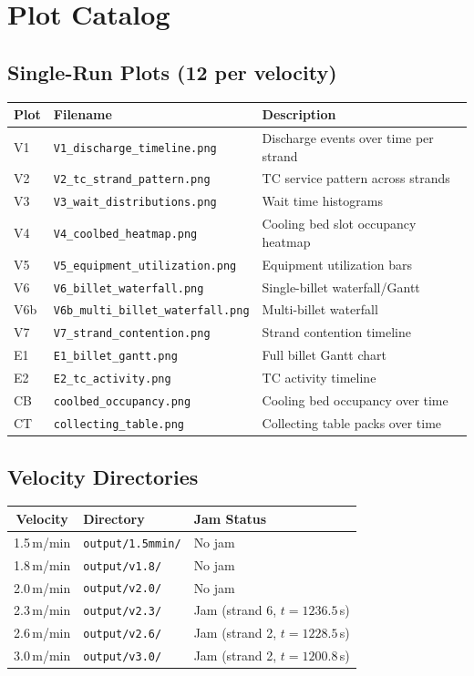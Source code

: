 \documentclass[11pt,a4paper]{article}
\begin{document}
\section{Plot Catalog}
\label{app:plots}

\subsection{Single-Run Plots (12 per velocity)}

\begin{longtable}{@{}llp{7cm}@{}}
\toprule
Plot & Filename & Description \\
\midrule
\endhead
V1 & \texttt{V1\_discharge\_timeline.png} & Discharge events over time per strand \\
V2 & \texttt{V2\_tc\_strand\_pattern.png} & TC service pattern across strands \\
V3 & \texttt{V3\_wait\_distributions.png} & Wait time histograms \\
V4 & \texttt{V4\_coolbed\_heatmap.png} & Cooling bed slot occupancy heatmap \\
V5 & \texttt{V5\_equipment\_utilization.png} & Equipment utilization bars \\
V6 & \texttt{V6\_billet\_waterfall.png} & Single-billet waterfall/Gantt \\
V6b & \texttt{V6b\_multi\_billet\_waterfall.png} & Multi-billet waterfall \\
V7 & \texttt{V7\_strand\_contention.png} & Strand contention timeline \\
E1 & \texttt{E1\_billet\_gantt.png} & Full billet Gantt chart \\
E2 & \texttt{E2\_tc\_activity.png} & TC activity timeline \\
CB & \texttt{coolbed\_occupancy.png} & Cooling bed occupancy over time \\
CT & \texttt{collecting\_table.png} & Collecting table packs over time \\
\bottomrule
\end{longtable}

\subsection{Velocity Directories}

\begin{table}[H]
\centering
\begin{tabular}{@{}cll@{}}
\toprule
Velocity & Directory & Jam Status \\
\midrule
1.5\,m/min & \texttt{output/1.5mmin/} & No jam \\
1.8\,m/min & \texttt{output/v1.8/} & No jam \\
2.0\,m/min & \texttt{output/v2.0/} & No jam \\
2.3\,m/min & \texttt{output/v2.3/} & Jam (strand 6, $t{=}1236.5$\,s) \\
2.6\,m/min & \texttt{output/v2.6/} & Jam (strand 2, $t{=}1228.5$\,s) \\
3.0\,m/min & \texttt{output/v3.0/} & Jam (strand 2, $t{=}1200.8$\,s) \\
\bottomrule
\end{tabular}
\end{table}
\end{document}
